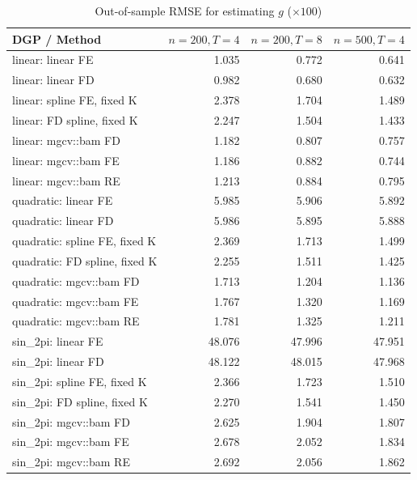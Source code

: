 \begin{table}[htbp]
\centering
\caption{Out-of-sample RMSE for estimating $g$ ($\times 100$)}
\label{tab:estimation_rmse}
\begin{tabular}{lrrr}
\toprule
DGP / Method & $n=200,T=4$ & $n=200,T=8$ & $n=500,T=4$ \\
\midrule
linear: linear FE & 1.035 & 0.772 & 0.641 \\
linear: linear FD & 0.982 & 0.680 & 0.632 \\
linear: spline FE, fixed K & 2.378 & 1.704 & 1.489 \\
linear: FD spline, fixed K & 2.247 & 1.504 & 1.433 \\
linear: mgcv::bam FD & 1.182 & 0.807 & 0.757 \\
linear: mgcv::bam FE & 1.186 & 0.882 & 0.744 \\
linear: mgcv::bam RE & 1.213 & 0.884 & 0.795 \\
quadratic: linear FE & 5.985 & 5.906 & 5.892 \\
quadratic: linear FD & 5.986 & 5.895 & 5.888 \\
quadratic: spline FE, fixed K & 2.369 & 1.713 & 1.499 \\
quadratic: FD spline, fixed K & 2.255 & 1.511 & 1.425 \\
quadratic: mgcv::bam FD & 1.713 & 1.204 & 1.136 \\
quadratic: mgcv::bam FE & 1.767 & 1.320 & 1.169 \\
quadratic: mgcv::bam RE & 1.781 & 1.325 & 1.211 \\
sin\_2pi: linear FE & 48.076 & 47.996 & 47.951 \\
sin\_2pi: linear FD & 48.122 & 48.015 & 47.968 \\
sin\_2pi: spline FE, fixed K & 2.366 & 1.723 & 1.510 \\
sin\_2pi: FD spline, fixed K & 2.270 & 1.541 & 1.450 \\
sin\_2pi: mgcv::bam FD & 2.625 & 1.904 & 1.807 \\
sin\_2pi: mgcv::bam FE & 2.678 & 2.052 & 1.834 \\
sin\_2pi: mgcv::bam RE & 2.692 & 2.056 & 1.862 \\
\bottomrule
\end{tabular}
\end{table}

